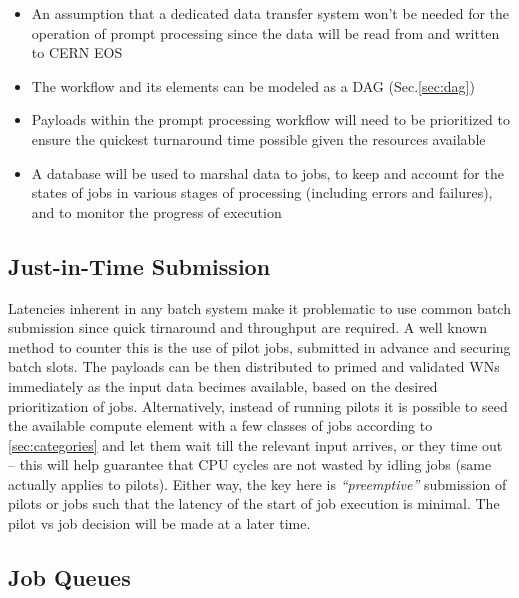 \documentclass[pdftex,12pt,letter]{article}
\begin{document}
\begin{itemize}

\item An assumption that a dedicated data transfer system won't be needed for the
operation of prompt processing since the data will be read from and written to CERN EOS

\item The workflow and its elements can be modeled as a DAG (Sec.\ref{sec:dag})

\item Payloads within the prompt processing workflow will need to be prioritized to ensure
the quickest turnaround time possible given the resources available

\item A database will be used to marshal data to jobs, to keep and account for the states
of jobs in various stages of processing (including errors and failures),
and to monitor the progress of execution

\end{itemize}

\subsection{Just-in-Time Submission}
Latencies inherent in any batch system make it problematic to use common batch submission since
quick tirnaround and throughput are required. A well known method to counter this is the use
of pilot jobs, submitted in advance and securing batch slots. The payloads can be then distributed
to primed and validated WNs immediately as the input data becimes available, based on the
desired prioritization of jobs. Alternatively, instead of running pilots it is possible to seed
the available compute element with a few classes of jobs according to \ref{sec:categories} and
let them wait till the relevant input arrives, or they time out -- this will help guarantee that
CPU cycles are not wasted by idling jobs (same actually applies to pilots). Either way, the key
here is \textit{``preemptive''} submission of pilots or jobs such that the latency of the start of job
execution is minimal. The pilot vs job decision will be made at a later time.

\subsection{Job Queues}
\end{document}
